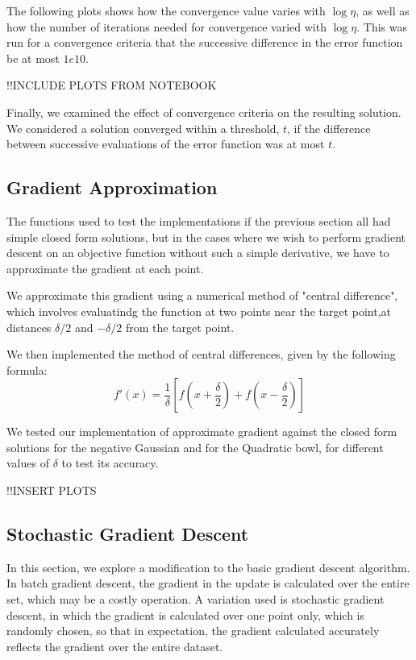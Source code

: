 \documentclass[11pt]{article}
\newcommand{\?}[0]{\vert}
\begin{document}
The following plots shows how the convergence value varies with $\log \eta$, as well as how the number of iterations needed for convergence varied with  $\log \eta$. This was run for a convergence criteria that the successive difference in the error function be at most $1e10$.


!!INCLUDE PLOTS FROM NOTEBOOK

Finally, we examined the effect of convergence criteria on the resulting solution. We considered a solution converged within a threshold, $t$, if the difference between successive evaluations of the error function was at most $t$.



\subsection{Gradient Approximation}

The functions used to test the implementations if the previous section all had simple closed form solutions, but in the cases where we wish to perform gradient descent on an objective function without such a simple derivative, we have to approximate the gradient at each point.

We approximate this gradient using a numerical method of "central difference", which involves evaluatindg the function at two points near the target point,at distances $\delta/2$ and $-\delta/2$ from the target point.

We then implemented the method of central differences, given by the following formula:
 $$f'(x) = \frac{1}{\delta} [f(x +\frac{\delta}{2})+ f(x-\frac{\delta}{2})]$$
 
We tested our implementation of approximate gradient against the closed form solutions for the negative Gaussian and for the Quadratic bowl, for different values of $\delta$ to test its accuracy.

!!INSERT PLOTS



 \subsection{Stochastic Gradient Descent}
 In this section, we explore a modification to the basic gradient descent algorithm. In batch gradient descent, the gradient in the update is calculated over the entire set, which may be a costly operation. A variation used is stochastic gradient descent, in which the gradient is calculated over one point only, which is randomly chosen, so that in expectation, the gradient calculated accurately reflects the gradient over the entire dataset. 
 
\end{document}
